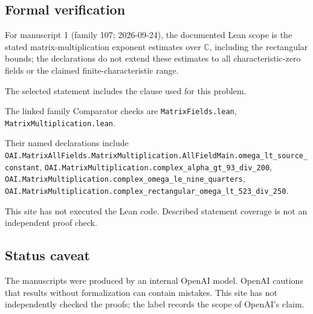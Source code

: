 \documentclass[11pt]{article}
\begin{document}
\subsection{Formal verification}
For manuscript 1 (family 107; 2026-09-24), the documented Lean scope is the stated matrix-multiplication exponent estimates over $\mathbb C$, including the rectangular bounds; the declarations do not extend these estimates to all characteristic-zero fields or the claimed finite-characteristic range.

The selected statement includes the clause used for this problem.

The linked family Comparator checks are \texttt{MatrixFields.lean}, \texttt{MatrixMultiplication.lean}.

Their named declarations include \texttt{OAI.MatrixAllFields.MatrixMultiplication.AllFieldMain.omega\_lt\_source\_constant}, \texttt{OAI.MatrixMultiplication.complex\_alpha\_gt\_93\_div\_200}, \texttt{OAI.MatrixMultiplication.complex\_omega\_le\_nine\_quarters}, \texttt{OAI.MatrixMultiplication.complex\_rectangular\_omega\_lt\_523\_div\_250}.

This site has not executed the Lean code. Described statement coverage is not an independent proof check.

\subsection{Status caveat}
The manuscripts were produced by an internal OpenAI model. OpenAI cautions that results without formalization can contain mistakes. This site has not independently checked the proofs; the label records the scope of OpenAI's claim.
\end{document}
